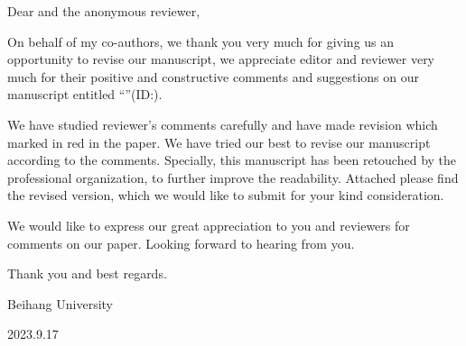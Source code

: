 \noindent Dear \editorname and the anonymous reviewer,

On behalf of my co-authors, we thank you very much for giving us an opportunity to revise our manuscript, we appreciate editor and reviewer very much for their positive and constructive comments and suggestions on our manuscript entitled \enquote{\thetitle}(ID:\manuscript).

We have studied reviewer's comments carefully and have made revision which marked in red in the paper. We have tried our best to revise our manuscript according to the comments. Specially, this manuscript has been retouched by the professional organization, to further improve the readability. Attached please find the revised version, which we would like to submit for your kind consideration.

We would like to express our great appreciation to you and reviewers for comments on our paper. Looking forward to hearing from you.

Thank you and best regards.

\begin{flushright}
\theauthor

Beihang University

2023.9.17
\end{flushright}